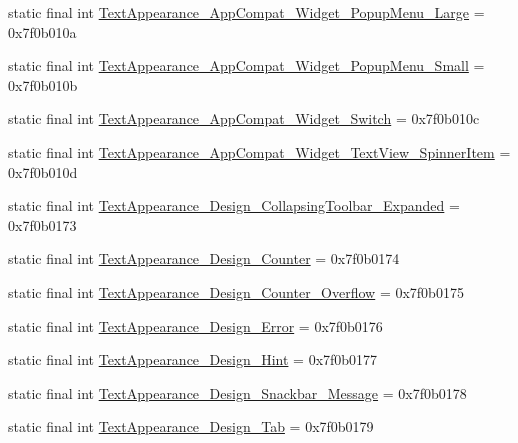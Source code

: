 \begin{CompactItemize}
\item 
static final int \hyperlink{classandroid_1_1support_1_1graphics_1_1drawable_1_1_r_1_1style_aa2fab9115b404803aa7edc5dae39d77}{TextAppearance\_\-AppCompat\_\-Widget\_\-PopupMenu\_\-Large} = 0x7f0b010a
\item 
static final int \hyperlink{classandroid_1_1support_1_1graphics_1_1drawable_1_1_r_1_1style_56b5dc572b30f896e2cfbe9a8122becf}{TextAppearance\_\-AppCompat\_\-Widget\_\-PopupMenu\_\-Small} = 0x7f0b010b
\item 
static final int \hyperlink{classandroid_1_1support_1_1graphics_1_1drawable_1_1_r_1_1style_1b9870e5000f68f106342a5234c4de32}{TextAppearance\_\-AppCompat\_\-Widget\_\-Switch} = 0x7f0b010c
\item 
static final int \hyperlink{classandroid_1_1support_1_1graphics_1_1drawable_1_1_r_1_1style_fdcddfc0352afea8b9549916ea1bd195}{TextAppearance\_\-AppCompat\_\-Widget\_\-TextView\_\-SpinnerItem} = 0x7f0b010d
\item 
static final int \hyperlink{classandroid_1_1support_1_1graphics_1_1drawable_1_1_r_1_1style_a0a6de2710c1ec56287b0eee6c0a94f7}{TextAppearance\_\-Design\_\-CollapsingToolbar\_\-Expanded} = 0x7f0b0173
\item 
static final int \hyperlink{classandroid_1_1support_1_1graphics_1_1drawable_1_1_r_1_1style_685d5f2b60d2c233fb71f7ad272184d5}{TextAppearance\_\-Design\_\-Counter} = 0x7f0b0174
\item 
static final int \hyperlink{classandroid_1_1support_1_1graphics_1_1drawable_1_1_r_1_1style_5ab6ecefff36bf5c0af4e91bc35deee9}{TextAppearance\_\-Design\_\-Counter\_\-Overflow} = 0x7f0b0175
\item 
static final int \hyperlink{classandroid_1_1support_1_1graphics_1_1drawable_1_1_r_1_1style_a010dc590ce45b2e9ae0601e1b808c11}{TextAppearance\_\-Design\_\-Error} = 0x7f0b0176
\item 
static final int \hyperlink{classandroid_1_1support_1_1graphics_1_1drawable_1_1_r_1_1style_9709a17fa0d25bc0c80b9330b31f5f94}{TextAppearance\_\-Design\_\-Hint} = 0x7f0b0177
\item 
static final int \hyperlink{classandroid_1_1support_1_1graphics_1_1drawable_1_1_r_1_1style_fc51aa748091250223627e9c8b101d08}{TextAppearance\_\-Design\_\-Snackbar\_\-Message} = 0x7f0b0178
\item 
static final int \hyperlink{classandroid_1_1support_1_1graphics_1_1drawable_1_1_r_1_1style_2798a228432793487ee033116e8c9fa5}{TextAppearance\_\-Design\_\-Tab} = 0x7f0b0179
\item 

\end{CompactItemize}
